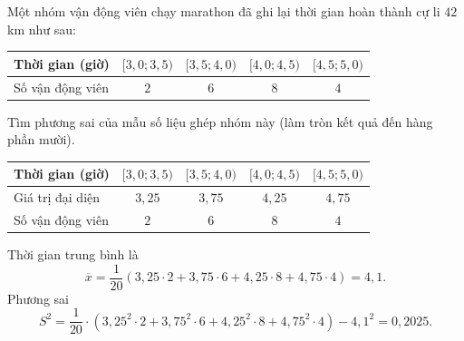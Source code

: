 \begin{ex}[Mức độ 2]%
Một nhóm vận động viên chạy marathon đã ghi lại thời gian hoàn thành cự li $42$ km như sau:
\begin{center}
\begin{tabular}{|l|c|c|c|c|}
\hline Thời gian (giờ) & {$[3{,}0; 3{,}5)$} & {$[3{,}5; 4{,}0)$} & {$[4{,}0; 4{,}5)$} & {$[4{,}5; 5{,}0)$} \\
\hline Số vận động viên & $2$ & $6$ & $8$ & $4$ \\
\hline
\end{tabular}
\end{center}
Tìm phương sai của mẫu số liệu ghép nhóm này (làm tròn kết quả đến hàng phần mười).
\loigiai
{
\begin{center}
\begin{tabular}{|l|c|c|c|c|}
\hline Thời gian (giờ) & {$[3{,}0; 3{,}5)$} & {$[3{,}5; 4{,}0)$} & {$[4{,}0; 4{,}5)$} & {$[4{,}5; 5{,}0)$} \\
\hline Giá trị đại diện & $3{,}25$ & $3{,}75$ & $4{,}25$ & $4{,}75$ \\
\hline Số vận động viên & $2$ & $6$ & $8$ & $4$ \\
\hline
\end{tabular}
\end{center}
Thời gian trung bình là
$$\overline{x}=\dfrac{1}{20}(3{,}25\cdot2+3{,}75\cdot6+4{,}25\cdot8+4{,}75\cdot4)=4{,}1.$$
Phương sai
$$S^2=\dfrac{1}{20}\cdot\left(3{,}25^2\cdot2+3{,}75^2\cdot6+4{,}25^2\cdot8+4{,}75^2\cdot4\right)-4{,}1^2=0{,}2025.$$
}
\end{ex}

